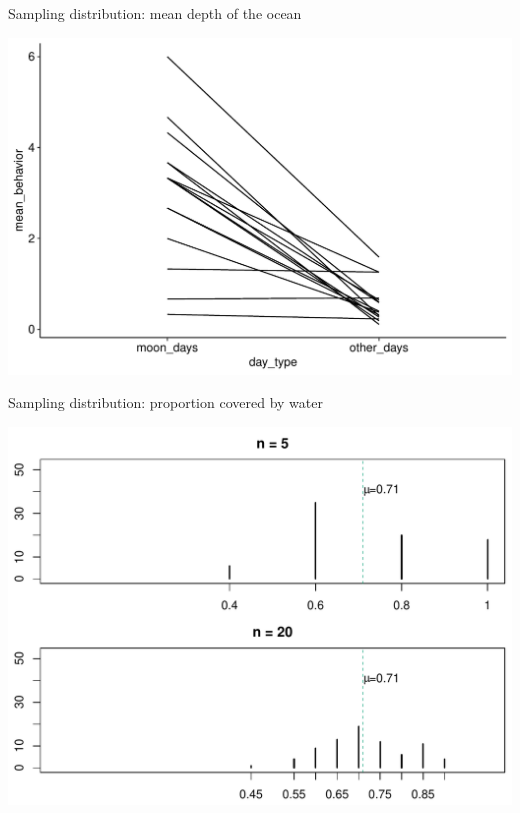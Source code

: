 \documentclass[10pt]{beamer}\usepackage[]{graphicx}\usepackage[]{color}
\makeatletter
\def\maxwidth{ %
  \ifdim\Gin@nat@width>\linewidth
    \linewidth
  \else
    \Gin@nat@width
  \fi
}
\newenvironment{knitrout}{}{} %
\makeatother
\begin{document}
\begin{frame}[fragile]{Sampling distribution: mean depth of the ocean}
	

	
\begin{knitrout}\tiny
{}\color{fgcolor}

{\centering \includegraphics[width=\maxwidth]{figure/unnamed-chunk-9-1} 

}



\end{knitrout}
	
\end{frame}



\begin{frame}[fragile]{Sampling distribution: proportion covered by water}
	

	
	
\begin{knitrout}\tiny
{}\color{fgcolor}

{\centering \includegraphics[width=\maxwidth]{figure/unnamed-chunk-11-1} 

}



\end{knitrout}
	
\end{frame}
\end{document}
